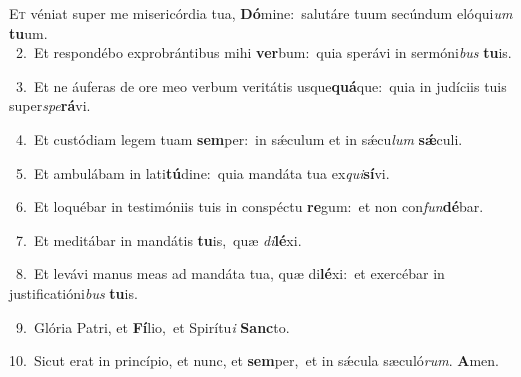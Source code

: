 \lettrine{\initial\textcolor{\initialcolor}{E}}{t} véniat super me misericórdia tua, \textbf{Dó}\-mine:~\star salutáre tuum secúndum elóqui\textit{um} \textbf{tu}\-um.\\
{\numbfont\textcolor{\numbcolor}{~2.}}~Et respondébo exprobrántibus mihi \textbf{ver}\-bum:~\star quia sperávi in sermóni\textit{bus} \textbf{tu}\-is.\par
{\numbfont\textcolor{\numbcolor}{~3.}}~Et ne áuferas de ore meo verbum veritátis usque\-\textbf{quá}\-que:~\star quia in judíciis tuis super\-\textit{spe}\-\textbf{rá}vi.\par
{\numbfont\textcolor{\numbcolor}{~4.}}~Et custódiam legem tuam \textbf{sem}\-per:~\star in sǽculum et in sǽcu\textit{lum} \textbf{sǽ}\-culi.\par
{\numbfont\textcolor{\numbcolor}{~5.}}~Et ambulábam in lati\-\textbf{tú}\-dine:~\star quia mandáta tua ex\-\textit{qui}\-\textbf{sí}vi.\par
{\numbfont\textcolor{\numbcolor}{~6.}}~Et loquébar in testimóniis tuis in conspéctu \textbf{re}\-gum:~\star et non con\-\textit{fun}\-\textbf{dé}bar.\par
{\numbfont\textcolor{\numbcolor}{~7.}}~Et meditábar in mandátis \textbf{tu}\-is,~\star quæ \textit{di}\-\textbf{lé}xi.\par
{\numbfont\textcolor{\numbcolor}{~8.}}~Et levávi manus meas ad mandáta tua, quæ di\-\textbf{lé}\-xi:~\star et exercébar in justificatióni\textit{bus} \textbf{tu}\-is.\par
{\numbfont\textcolor{\numbcolor}{~9.}}~Glória Patri, et \textbf{Fí}\-lio,~\star et Spirítu\textit{i} \textbf{Sanc}\-to.\par
{\numbfont\textcolor{\numbcolor}{10.}}~Sicut erat in princípio, et nunc, et \textbf{sem}\-per,~\star et in sǽcula sæculó\-\textit{rum}\-. \textbf{A}\-men.\par
